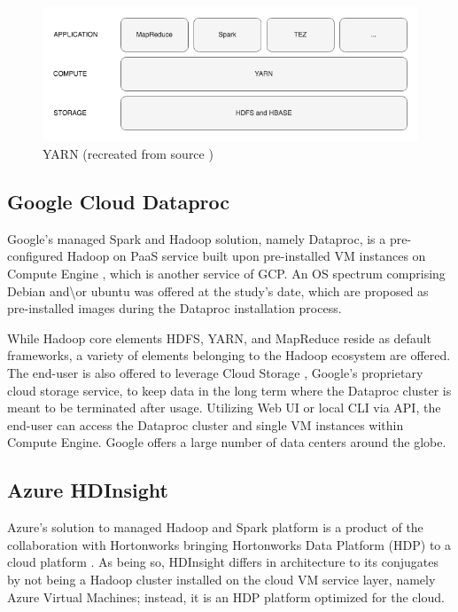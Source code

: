 \documentclass[review]{elsarticle}
\begin{document}
	\begin{figure}[h!]
		\caption{YARN (recreated from source \cite{dean_mapreduce_2004})}
		\label{fig:YARNoverview}
		\includegraphics[width=\textwidth]{YARNoverview}
		\centering
	\end{figure}
	
	
	\subsection{Google Cloud Dataproc}\label{GCP_Dataproc}
	Google's managed Spark and Hadoop solution, namely Dataproc, is a pre-configured Hadoop on PaaS service built upon pre-installed VM instances on Compute Engine \cite{noauthor_compute_nodate}, which is another service of GCP. An OS spectrum comprising Debian and\textbackslash{or} ubuntu was offered at the study's date, which are proposed as pre-installed images during the Dataproc installation process. 
	
	While Hadoop core elements HDFS, YARN, and MapReduce reside as default frameworks, a variety of elements belonging to the Hadoop ecosystem are offered. The end-user is also offered to leverage Cloud Storage \cite{noauthor_cloud_nodate}, Google's proprietary cloud storage service, to keep data in the long term where the Dataproc cluster is meant to be terminated after usage. Utilizing Web UI or local CLI via API, the end-user can access the Dataproc cluster and single VM instances within Compute Engine. Google offers a large number of data centers around the globe.
	
	\subsection{Azure HDInsight}\label{Azure_HDInsight}
	Azure's solution to managed Hadoop and Spark platform is a product of the collaboration with Hortonworks bringing Hortonworks Data Platform (HDP) to a cloud platform \cite{noauthor_azuravail_nodate}. As being so, HDInsight differs in architecture to its conjugates by not being a Hadoop cluster installed on the cloud VM service layer, namely Azure Virtual Machines; instead, it is an HDP platform optimized for the cloud. 
	
\end{document}
